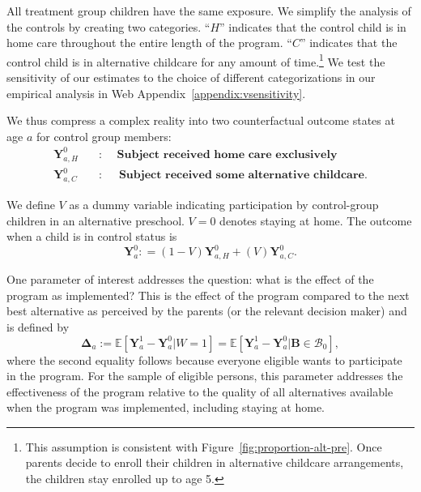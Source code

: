 All treatment group children have the same exposure. We simplify the analysis of the controls by creating two categories. ``$H$'' indicates that the control child is in home care throughout the entire length of the program. ``$C$'' indicates that the control child is in alternative childcare for any amount of time.\footnote{This assumption is consistent with Figure~\ref{fig:proportion-alt-pre}. Once parents decide to enroll their children in alternative childcare arrangements, the children stay enrolled up to age 5.} We test the sensitivity of our estimates to the choice of different categorizations in our empirical analysis in Web Appendix~\ref{appendix:vsensitivity}.

We thus compress a complex reality into two counterfactual outcome states at age $a$ for control group members:
\begin{align*}
\bm{Y}_{a,H}^0 \quad &: \quad \textbf{ Subject received home care exclusively} \\
\bm{Y}_{a,C}^0 \quad &: \quad \textbf{ Subject received some alternative childcare}.
\end{align*}

We define $V$ as a dummy variable indicating participation by control-group children in an alternative preschool. $V=0$ denotes staying at home. The outcome when a child is in control status is
\begin{equation}
\bm{Y}^0_a : = \left( 1 - V \right) \bm{Y}^0_{a,H} + \left( V \right) \bm{Y}^0_{a,C}. \label{eq:meandiff}
\end{equation}

One parameter of interest addresses the question: what is the effect of the program as implemented? This is the effect of the program compared to the next best alternative as perceived by the parents (or the relevant decision maker) and is defined by
\begin{equation}\label{eq:effect}
\bm{\Delta}_a := \mathbb{E} \left[ \bm{Y}^1_a -  \bm{Y}^0_a | W =1 \right] = \mathbb{E} \left[\bm{Y}^1_a - \bm{Y}^0_a | \bm{B} \in \mathcal{B}_0 \right],
\end{equation}
where the second equality follows because everyone eligible wants to participate in the program. For the sample of eligible persons, this parameter addresses the effectiveness of the program relative to the quality of all alternatives available when the program was implemented, including staying at home.

